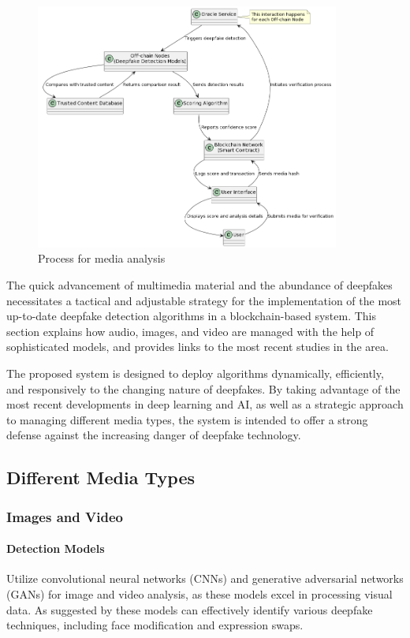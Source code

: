 \documentclass{article}
\begin{document}
\begin{figure}
	\centering
        \includegraphics[width=10cm]{diagram2.png}
        \caption{Process for media analysis}
	\label{fig:fig2}
\end{figure}

The quick advancement of multimedia material and the abundance of deepfakes necessitates a tactical and adjustable strategy for the implementation of the most up-to-date deepfake detection algorithms in a blockchain-based system. This section explains how audio, images, and video are managed with the help of sophisticated models, and provides links to the most recent studies in the area.

The proposed system is designed to deploy algorithms dynamically, efficiently, and responsively to the changing nature of deepfakes. By taking advantage of the most recent developments in deep learning and AI, as well as a strategic approach to managing different media types, the system is intended to offer a strong defense against the increasing danger of deepfake technology.

\subsection{Different Media Types}
\subsubsection{Images and Video}
\paragraph{Detection Models} Utilize convolutional neural networks (CNNs) and generative adversarial networks (GANs) for image and video analysis, as these models excel in processing visual data. As suggested by \citep{tolosana2020deepfakes} these models can effectively identify various deepfake techniques, including face modification and expression swaps.
\end{document}
